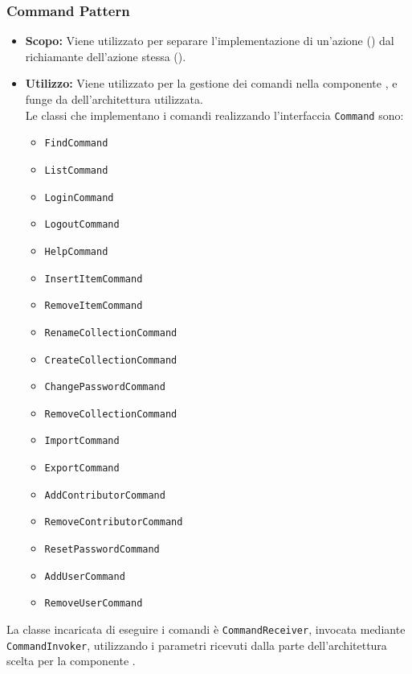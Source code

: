 \documentclass{scalatekids-article}
\begin{document}
\subsubsection{Command Pattern}

\label{sec:CommandPattern}

\begin{itemize}
\item \textbf{Scopo:} Viene utilizzato per separare l'implementazione di un'azione
  () dal richiamante dell'azione stessa ().
\item \textbf{Utilizzo:} Viene utilizzato per la gestione dei comandi nella componente
  , e funge da  dell'architettura  utilizzata.\\
  Le classi che implementano i comandi realizzando l'interfaccia \verb=Command= sono:
  \begin{itemize}
  \item \verb=FindCommand=
  \item \verb=ListCommand=
  \item \verb=LoginCommand=
  \item \verb=LogoutCommand=
  \item \verb=HelpCommand=
  \item \verb=InsertItemCommand=
  \item \verb=RemoveItemCommand=
  \item \verb=RenameCollectionCommand=
  \item \verb=CreateCollectionCommand=
  \item \verb=ChangePasswordCommand=
  \item \verb=RemoveCollectionCommand=
  \item \verb=ImportCommand=
  \item \verb=ExportCommand=
  \item \verb=AddContributorCommand=
  \item \verb=RemoveContributorCommand=
  \item \verb=ResetPasswordCommand=
  \item \verb=AddUserCommand=
  \item \verb=RemoveUserCommand=
  \end{itemize}
\end{itemize}

La classe incaricata di eseguire i comandi è \verb=CommandReceiver=, invocata mediante
\verb=CommandInvoker=, utilizzando i parametri ricevuti dalla parte 
dell'architettura  scelta per la componente .
\end{document}
